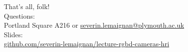 \documentclass[compress]{beamer}
\begin{document}
\begin{frame}{}
    \begin{center}
        \Large
        That's all, folk!\\[2em]
        \normalsize
        Questions:\\
        Portland Square A216 or \url{severin.lemaignan@plymouth.ac.uk} \\[1em]

        Slides:\\ \url{github.com/severin-lemaignan/lecture-rgbd-cameras-hri}
    \end{center}
\end{frame}
\end{document}
